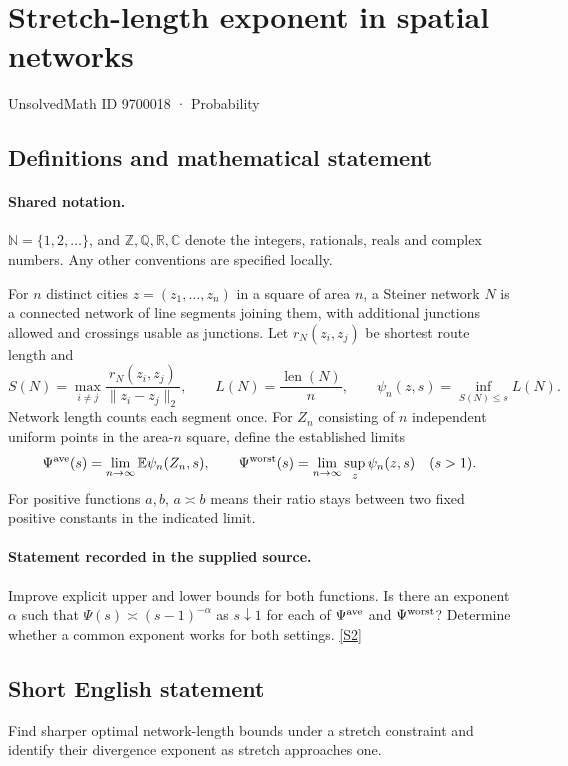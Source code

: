 \documentclass[11pt]{article}
\newcommand{\sref}[2]{\hyperlink{source:#1:#2}{[S#2]}}
\begin{document}
\setcounter{section}{9700017}
\section{Stretch-length exponent in spatial networks}\label{9700018}
{\small\sffamily UnsolvedMath ID 9700018 · Probability}
\subsection{Definitions and mathematical statement}

\paragraph{Shared notation.}$\mathbb N=\{1,2,\ldots\}$, and $\mathbb Z,\mathbb Q,\mathbb R,\mathbb C$ denote the integers, rationals, reals and complex numbers. Any other conventions are specified locally.


For $n$ distinct cities $z=(z_1,\ldots,z_n)$ in a square of area $n$, a Steiner network $N$ is a connected network of line segments joining them, with additional junctions allowed and crossings usable as junctions. Let $r_N(z_i,z_j)$ be shortest route length and
\[S(N)=\max_{i\ne j}\frac{r_N(z_i,z_j)}{\|z_i-z_j\|_2},\qquad L(N)=\frac{\operatorname{len}(N)}n,\qquad \psi_n(z,s)=\inf_{S(N)\le s}L(N).\]
Network length counts each segment once. For $Z_n$ consisting of $n$ independent uniform points in the area-$n$ square, define the established limits
\[\Psi^{\rm ave}(s)=\lim_{n\to\infty}\mathbb E\psi_n(Z_n,s),\qquad\Psi^{\rm worst}(s)=\lim_{n\to\infty}\sup_z\psi_n(z,s)\quad(s>1).\]
For positive functions $a,b$, $a\asymp b$ means their ratio stays between two fixed positive constants in the indicated limit.
\paragraph{Statement recorded in the supplied source.}
Improve explicit upper and lower bounds for both functions. Is there an exponent $\alpha$ such that $\Psi(s)\asymp(s-1)^{-\alpha}$ as $s\downarrow1$ for each of $\Psi^{\rm ave}$ and $\Psi^{\rm worst}$? Determine whether a common exponent works for both settings. \sref{9700018}{2}
\subsection{Short English statement}
Find sharper optimal network-length bounds under a stretch constraint and identify their divergence exponent as stretch approaches one.
\end{document}
